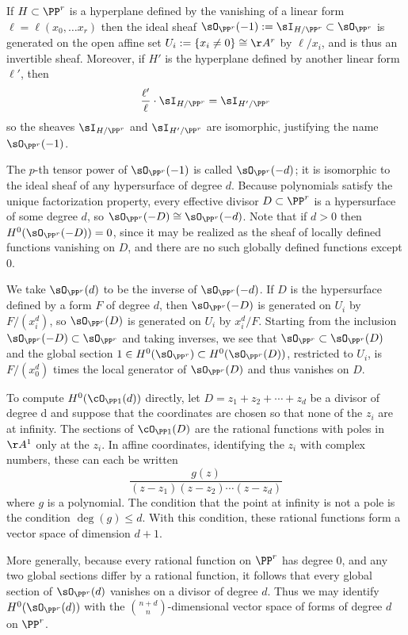 \begin{example} \label{linear systems on Pr} If $H\subset \PP^{r}$ is a hyperplane defined by the vanishing of a linear form $\ell = \ell(x_{0}, \dots x_{r})$ then the ideal sheaf $\sO_{\PP^{r}}(-1) := \sI_{H/\PP^{r}}\subset \sO_{\PP^{r}}$ is generated on the open affine set 
$U_{i}:= \{x_{i}\neq 0\} \cong \AA^{r}$
by $\ell/x_{i}$, and is thus an invertible sheaf. 
Moreover, if $H'$ is the hyperplane defined by another linear form $\ell'$, then 
$$
\frac{\ell'}{\ell}\cdot\sI_{H/\PP^{r}} = \sI_{H'/\PP^{r}} 
$$
so the sheaves $\sI_{H/\PP^{r}}$ and $\sI_{H'/\PP^{r}} $ are isomorphic, justifying the name $\sO_{\PP^{r}}(-1)$.

The $p$-th tensor power of $\sO_{\PP^{r}}(-1)$ is called $\sO_{\PP^{r}}(-d)$; it is isomorphic to the
ideal sheaf of any hypersurface of degree $d$. Because polynomials satisfy the unique factorization property,
every effective divisor $D\subset \PP^{r}$ is a hypersurface of some degree $d$, so
$\sO_{\PP^{r}}(-D) \cong \sO_{\PP^{r}}(-d)$. Note that if $d>0$ then $H^{0}(\sO_{\PP^{r}}(-D)) = 0$, since it may be realized
as the sheaf of locally defined functions vanishing on $D$, and there are no such
globally defined functions except 0.

We take $\sO_{\PP^{r}}(d)$ to be the inverse of $\sO_{\PP^{r}}(-d)$. If $D$ is the hypersurface defined by 
a form $F$ of degree $d$, then $\sO_{\PP^{r}}(-D)$ is generated on $U_{i}$ by $F/(x_{i}^{d})$, so
$\sO_{\PP^{r}}(D)$ is generated on $U_{i}$ by $x_{i}^{d}/F$.
Starting from the inclusion 
$
\sO_{\PP^{r}}(-D) \subset \sO_{\PP^{r}}
$
and taking inverses, we see that 
$
\sO_{\PP^{r}} \subset \sO_{\PP^{r}}(D)
$
and the global section $1\in H^0(\sO_{\PP^{r}})\subset H^0(\sO_{\PP^{r}}(D))$, restricted to
$U_{i}$, is $F/(x_{0}^{d})$ times the local generator of $\sO_{\PP^{r}}(D)$ and thus vanishes on $D$.
 
To compute $H^0(\cO_{\PP1} (d))$ directly, let $D = z_1 +z_2 +\cdots+z_d$ be a divisor of degree d and suppose that the coordinates are chosen so that none of the $z_i$ are at infinity. The sections of $\cO_{\PP1} (D)$ are the rational functions with poles in $\AA^1$ only at 
the $z_i$. In affine coordinates, identifying the $z_i$ with complex numbers, these can each be written
$$
\frac{g(z)}{(z-z_1)(z-z_2)\cdots(z-z_d)}
$$
where $g$ is a polynomial. The condition that the point at infinity is not a pole is the condition $\deg(g) \leq d$. With this condition, these rational functions form a vector space of dimension $d+1$.

More generally, because every
rational function on $\PP^{r}$ has degree 0, and any two global sections differ by a rational
function, it follows that every global section of $\sO_{\PP^{r}}(d)$ vanishes on a divisor of degree $d$. Thus
we may identify $H^{0}(\sO_{\PP^{r}}(d))$ with the ${n+d\choose n}$-dimensional vector space of forms of degree $d$ on $\PP^{r}$.
\end{example}

